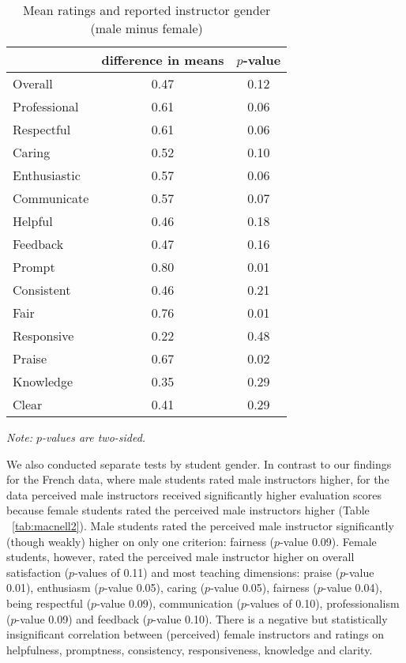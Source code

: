 \documentclass[12pt]{article}
\begin{document}
\begin{table}[htbp]
  \centering
  \footnotesize 
  \caption{Mean ratings and reported instructor gender (male minus female)}
    \begin{tabular}{lcc}
    \toprule 
                          & difference in means  & $p$-value  \\
   \midrule
    Overall &                 0.47       & 0.12   \\
    Professional &            0.61       & 0.06   \\
    Respectful			   &  0.61       & 0.06   \\
    Caring &                  0.52       & 0.10    \\
    Enthusiastic   &          0.57       & 0.06     \\
    Communicate        &      0.57       & 0.07     \\
    Helpful   &               0.46       & 0.18     \\
    Feedback   &              0.47       & 0.16     \\
    Prompt    &               0.80       & 0.01     \\
    Consistent   &            0.46       & 0.21     \\
    Fair   &                  0.76       & 0.01     \\
    Responsive   &            0.22       & 0.48     \\
    Praise   &                0.67       & 0.02     \\
    Knowledge   &             0.35       & 0.29     \\
    Clear   &                 0.41       & 0.29     \\
    \bottomrule
    \end{tabular}%
 \label{tab:macnell1}%
  
  \textit{Note: $p$-values are two-sided.}
\end{table}%
\normalsize


We also conducted separate tests by student gender.
In contrast to our findings for the French data, where male students rated male instructors higher, 
for the \citet{MacNell2014} data perceived male instructors received significantly higher evaluation scores because female students rated the perceived male instructors higher 
(Table ~\ref{tab:macnell2}). 
Male students rated the perceived male instructor significantly (though weakly) higher on only one criterion: fairness ($p$-value 0.09). 
Female students, however, rated the perceived male instructor higher on overall satisfaction ($p$-values of 0.11) and most teaching dimensions: praise ($p$-value 0.01), enthusiasm ($p$-value 0.05), caring ($p$-value 0.05), fairness ($p$-value 0.04), being respectful ($p$-value 0.09),  communication ($p$-values of 0.10), 
professionalism ($p$-value 0.09) and feedback ($p$-value 0.10). 
There is a negative but statistically insignificant correlation between (perceived) 
female instructors
and ratings on helpfulness, promptness, consistency, responsiveness, knowledge and clarity.
\end{document}
